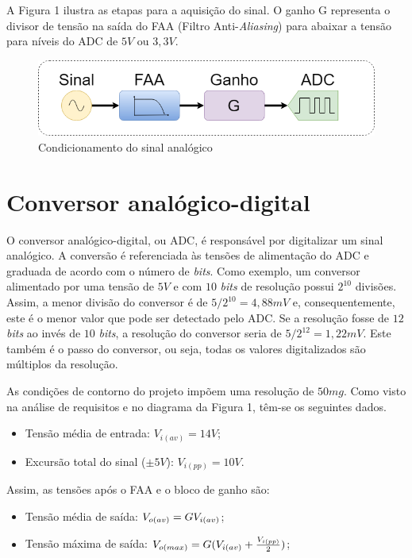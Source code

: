 \documentclass[11pt]{abntex2}
\begin{document}
			A Figura 1 ilustra as etapas para a aquisição do sinal. O ganho G representa o
			divisor de tensão na saída do FAA (Filtro Anti-\textit{Aliasing}) para abaixar a tensão para níveis do ADC de $5V$
			ou $3,3V$.

			\begin{figure}[H]
				\centering
				\includegraphics[width=\linewidth]{../Fotos/Diagramas/sinalFaaADC/sinalFaaADC.png}
				\caption{Condicionamento do sinal analógico}
			\end{figure}

		\section{Conversor analógico-digital}
			O conversor analógico-digital, ou ADC, é responsável por digitalizar um sinal analógico. A
			conversão é referenciada às tensões de alimentação do ADC e graduada
			de acordo com o número de \textit{bits}. Como exemplo, um conversor
			alimentado por uma tensão de $5V$ e com $10$ \textit{bits} de
			resolução possui $2^{10}$ divisões. Assim, a menor divisão do
			conversor é de $5/2^{10} = 4,88mV$ e, consequentemente, este é o
			menor valor que pode ser detectado pelo ADC. Se a resolução fosse de
			$12$
			\textit{bits} ao invés de $10$ \textit{bits}, a resolução do conversor seria de $5/2^{12}
			=1,22mV$. Este também é o passo do conversor, ou seja, todas os valores
			digitalizados são múltiplos da resolução.

			As condições de contorno do projeto impõem uma resolução de $50mg$. Como
			visto na análise de requisitos e no diagrama da Figura 1, têm-se os
			seguintes dados.
			\begin{itemize}
				
				\item Tensão média de entrada: $V_{i(av)} = 14V$;
				\item Excursão total do sinal ($\pm5V$): $V_{i(pp)} = 10V$.
				
			\end{itemize}
			Assim, as tensões após o FAA e o bloco de ganho são:

			\begin{itemize}	
				\item Tensão média de saída: $V_{o(av)} = G\* V_{i(av)}$;
				\item Tensão máxima de saída: $V_{o(max)} = G\* (V_{i(av)} + \frac{V_{i(pp)}}{2})$;
			\end{itemize}	
				
\end{document}
